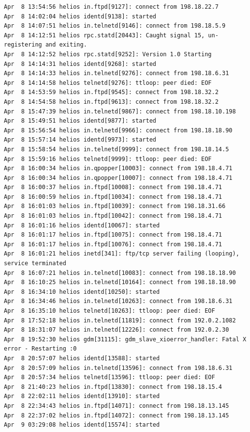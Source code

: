 \begin{lstlisting}[style=terminal]
Apr  8 13:54:56 helios in.ftpd[9127]: connect from 198.18.22.7
Apr  8 14:02:04 helios identd[9138]: started
Apr  8 14:07:51 helios in.telnetd[9146]: connect from 198.18.5.9
Apr  8 14:12:51 helios rpc.statd[20443]: Caught signal 15, un-registering and exiting.
Apr  8 14:12:52 helios rpc.statd[9252]: Version 1.0 Starting
Apr  8 14:14:31 helios identd[9268]: started
Apr  8 14:14:33 helios in.telnetd[9276]: connect from 198.18.6.31
Apr  8 14:14:58 helios telnetd[9276]: ttloop: peer died: EOF
Apr  8 14:53:59 helios in.ftpd[9545]: connect from 198.18.32.2
Apr  8 14:54:58 helios in.ftpd[9613]: connect from 198.18.32.2
Apr  8 15:47:39 helios in.telnetd[9867]: connect from 198.18.10.198
Apr  8 15:49:51 helios identd[9877]: started
Apr  8 15:56:54 helios in.telnetd[9966]: connect from 198.18.18.90
Apr  8 15:57:14 helios identd[9973]: started
Apr  8 15:58:54 helios in.telnetd[9999]: connect from 198.18.14.5
Apr  8 15:59:16 helios telnetd[9999]: ttloop: peer died: EOF
Apr  8 16:00:34 helios in.qpopper[10003]: connect from 198.18.4.71
Apr  8 16:00:34 helios in.qpopper[10007]: connect from 198.18.4.71
Apr  8 16:00:37 helios in.ftpd[10008]: connect from 198.18.4.71
Apr  8 16:00:59 helios in.ftpd[10034]: connect from 198.18.4.71
Apr  8 16:01:03 helios in.ftpd[10039]: connect from 198.18.31.66
Apr  8 16:01:03 helios in.ftpd[10042]: connect from 198.18.4.71
Apr  8 16:01:16 helios identd[10067]: started
Apr  8 16:01:17 helios in.ftpd[10075]: connect from 198.18.4.71
Apr  8 16:01:17 helios in.ftpd[10076]: connect from 198.18.4.71
Apr  8 16:01:21 helios inetd[341]: ftp/tcp server failing (looping), service terminated
Apr  8 16:07:21 helios in.telnetd[10083]: connect from 198.18.18.90
Apr  8 16:10:25 helios in.telnetd[10164]: connect from 198.18.18.90
Apr  8 16:34:10 helios identd[10250]: started
Apr  8 16:34:46 helios in.telnetd[10263]: connect from 198.18.6.31
Apr  8 16:35:10 helios telnetd[10263]: ttloop: peer died: EOF
Apr  8 17:52:18 helios in.telnetd[11819]: connect from 192.0.2.1082
Apr  8 18:31:07 helios in.telnetd[12226]: connect from 192.0.2.30
Apr  8 19:52:30 helios gdm[31115]: gdm_slave_xioerror_handler: Fatal X error - Restarting :0
Apr  8 20:57:07 helios identd[13588]: started
Apr  8 20:57:09 helios in.telnetd[13596]: connect from 198.18.6.31
Apr  8 20:57:34 helios telnetd[13596]: ttloop: peer died: EOF
Apr  8 21:40:23 helios in.ftpd[13830]: connect from 198.18.15.4
Apr  8 22:02:11 helios identd[13910]: started
Apr  8 22:34:43 helios in.ftpd[14071]: connect from 198.18.13.145
Apr  8 22:37:02 helios in.ftpd[14072]: connect from 198.18.13.145
Apr  9 03:29:08 helios identd[15574]: started

\end{lstlisting}
